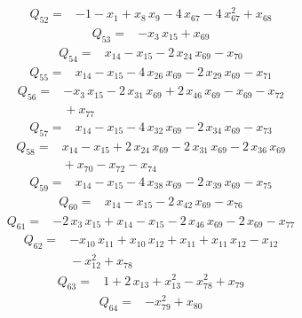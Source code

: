 \documentclass[11pt]{article}
\theoremstyle{definition}\newtheorem{definition}[theorem]{Definition}
\begin{document}
\begin{align*}
Q_{52}={}&-1-x_{1}+x_{8}\,x_{9}-4\,x_{67}-4\,x_{67}^{2}+x_{68}
\end{align*}
\begin{align*}
Q_{53}={}&-x_{3}\,x_{15}+x_{69}
\end{align*}
\begin{align*}
Q_{54}={}&x_{14}-x_{15}-2\,x_{24}\,x_{69}-x_{70}
\end{align*}
\begin{align*}
Q_{55}={}&x_{14}-x_{15}-4\,x_{26}\,x_{69}-2\,x_{29}\,x_{69}-x_{71}
\end{align*}
\begin{align*}
Q_{56}={}&-x_{3}\,x_{15}-2\,x_{31}\,x_{69}+2\,x_{46}\,x_{69}-x_{69}-x_{72}
\\ &{}+x_{77}
\end{align*}
\begin{align*}
Q_{57}={}&x_{14}-x_{15}-4\,x_{32}\,x_{69}-2\,x_{34}\,x_{69}-x_{73}
\end{align*}
\begin{align*}
Q_{58}={}&x_{14}-x_{15}+2\,x_{24}\,x_{69}-2\,x_{31}\,x_{69}-2\,x_{36}\,x_{69}
\\ &{}+x_{70}-x_{72}-x_{74}
\end{align*}
\begin{align*}
Q_{59}={}&x_{14}-x_{15}-4\,x_{38}\,x_{69}-2\,x_{39}\,x_{69}-x_{75}
\end{align*}
\begin{align*}
Q_{60}={}&x_{14}-x_{15}-2\,x_{42}\,x_{69}-x_{76}
\end{align*}
\begin{align*}
Q_{61}={}&-2\,x_{3}\,x_{15}+x_{14}-x_{15}-2\,x_{46}\,x_{69}-2\,x_{69}-x_{77}
\end{align*}
\begin{align*}
Q_{62}={}&-x_{10}\,x_{11}+x_{10}\,x_{12}+x_{11}+x_{11}\,x_{12}-x_{12}
\\ &{}-x_{12}^{2}+x_{78}
\end{align*}
\begin{align*}
Q_{63}={}&1+2\,x_{13}+x_{13}^{2}-x_{78}^{2}+x_{79}
\end{align*}
\begin{align*}
Q_{64}={}&-x_{79}^{2}+x_{80}
\end{align*}
\end{document}
